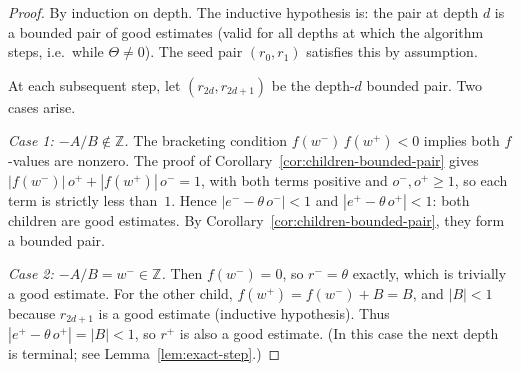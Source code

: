 \documentclass[12pt]{article}
\theoremstyle{definition}
\theoremstyle{remark}
\theoremstyle{plain}
\newcommand{\Kval}{\Theta}
\newcommand{\wplus}{w^{+}}
\newcommand{\wminus}{w^{-}}
\newcommand{\eplus}{e^{+}}
\newcommand{\eminus}{e^{-}}
\newcommand{\odenp}{o^{+}}
\newcommand{\odenm}{o^{-}}
\begin{document}
\begin{proof}
By induction on depth.  The inductive hypothesis is: the pair at depth $d$ is
a bounded pair of good estimates (valid for all depths at which the algorithm
steps, i.e.\ while $\Kval \neq 0$).  The seed pair $(r_0, r_1)$ satisfies this by
assumption.

At each subsequent step, let $(r_{2d}, r_{2d+1})$ be the depth-$d$ bounded pair.
Two cases arise.

\emph{Case 1: $-A/B \notin \mathbb{Z}$.}  The bracketing condition
$f(\wminus)\,f(\wplus) < 0$ implies both $f$-values are nonzero.
The proof of Corollary~\ref{cor:children-bounded-pair} gives
$|f(\wminus)|\,\odenp + |f(\wplus)|\,\odenm = 1$, with both terms positive and
$\odenm, \odenp \geq 1$, so each term is strictly less than~$1$.
Hence $|\eminus - \theta\,\odenm| < 1$ and $|\eplus - \theta\,\odenp| < 1$:
both children are good estimates.  By Corollary~\ref{cor:children-bounded-pair},
they form a bounded pair.

\emph{Case 2: $-A/B = \wminus \in \mathbb{Z}$.}
Then $f(\wminus) = 0$, so $r^- = \theta$ exactly, which is trivially a good estimate.
For the other child, $f(\wplus) = f(\wminus) + B = B$, and $|B| < 1$ because
$r_{2d+1}$ is a good estimate (inductive hypothesis).
Thus $|\eplus - \theta\,\odenp| = |B| < 1$, so $r^+$ is also a good estimate.
(In this case the next depth is terminal; see Lemma~\ref{lem:exact-step}.)
\end{proof}
\end{document}
